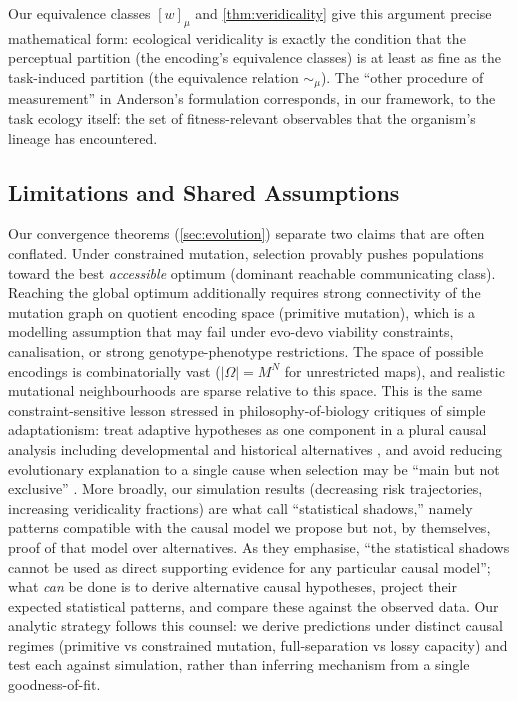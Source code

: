 \documentclass[12pt]{article}
\begin{document}
Our equivalence classes $[w]_\mu$ and \cref{thm:veridicality} give this argument precise mathematical form: ecological veridicality is exactly the condition that the perceptual partition (the encoding's equivalence classes) is at least as fine as the task-induced partition (the equivalence relation ${\sim_\mu}$). The ``other procedure of measurement'' in Anderson's formulation corresponds, in our framework, to the task ecology itself: the set of fitness-relevant observables that the organism's lineage has encountered.

\subsection{Limitations and Shared Assumptions}\label{sec:limitations}

Our convergence theorems (\cref{sec:evolution}) separate two claims that are often conflated. Under constrained mutation, selection provably pushes populations toward the best \emph{accessible} optimum (dominant reachable communicating class). Reaching the global optimum additionally requires strong connectivity of the mutation graph on quotient encoding space (primitive mutation), which is a modelling assumption that may fail under evo-devo viability constraints, canalisation, or strong genotype-phenotype restrictions. The space of possible encodings is combinatorially vast ($|\Omega| = M^N$ for unrestricted maps), and realistic mutational neighbourhoods are sparse relative to this space. This is the same constraint-sensitive lesson stressed in philosophy-of-biology critiques of simple adaptationism: treat adaptive hypotheses as one component in a plural causal analysis including developmental and historical alternatives \citep[ch.~5]{pigliucci_kaplan_2006}, and avoid reducing evolutionary explanation to a single cause when selection may be ``main but not exclusive'' \citep[p.~361]{sober_2008}. More broadly, our simulation results (decreasing risk trajectories, increasing veridicality fractions) are what \citet[pp.~4--5]{pigliucci_kaplan_2006} call ``statistical shadows,'' namely patterns compatible with the causal model we propose but not, by themselves, proof of that model over alternatives. As they emphasise, ``the statistical shadows cannot be used as direct supporting evidence for any particular causal model''; what \emph{can} be done is to derive alternative causal hypotheses, project their expected statistical patterns, and compare these against the observed data. Our analytic strategy follows this counsel: we derive predictions under distinct causal regimes (primitive vs constrained mutation, full-separation vs lossy capacity) and test each against simulation, rather than inferring mechanism from a single goodness-of-fit.
\end{document}
